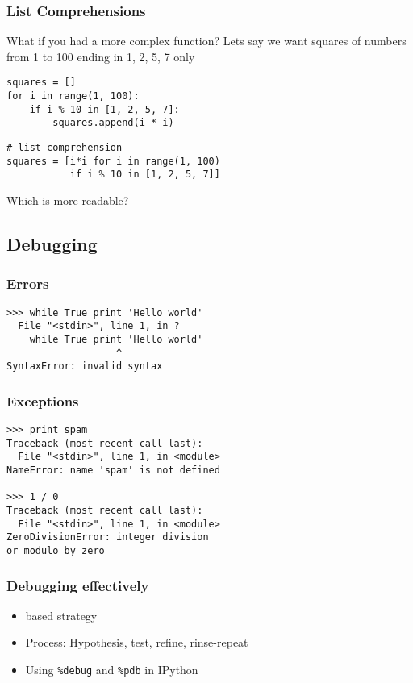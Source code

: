 \documentclass[14pt,compress]{beamer}
\newcounter{time}
\newcommand{\inctime}[1]{\addtocounter{time}{#1}{\tiny \thetime\ m}}
\newcommand{\typ}[1]{\texttt{#1}}
\newcommand{\kwrd}[1]{ \texttt{\textbf{\color{blue}{#1}}}  }
\begin{document}
\begin{frame}[fragile]
    \frametitle{List Comprehensions}
What if you had a more complex function?
Lets say we want squares of numbers from 1 to 100 ending in 1, 2, 5, 7 only
    \begin{lstlisting}
squares = []
for i in range(1, 100):
    if i % 10 in [1, 2, 5, 7]:
        squares.append(i * i)
    \end{lstlisting}
    \begin{lstlisting}
# list comprehension
squares = [i*i for i in range(1, 100)
           if i % 10 in [1, 2, 5, 7]]
     \end{lstlisting}
Which is more readable?
\inctime{15}
\end{frame}


\subsection{Debugging}
\begin{frame}[fragile]
 \frametitle{Errors}
 \begin{lstlisting}
>>> while True print 'Hello world'
  File "<stdin>", line 1, in ?
    while True print 'Hello world'
                   ^
SyntaxError: invalid syntax
\end{lstlisting}
\end{frame}

\begin{frame}[fragile]
 \frametitle{Exceptions}
 \begin{lstlisting}
>>> print spam
Traceback (most recent call last):
  File "<stdin>", line 1, in <module>
NameError: name 'spam' is not defined

>>> 1 / 0
Traceback (most recent call last):
  File "<stdin>", line 1, in <module>
ZeroDivisionError: integer division 
or modulo by zero
\end{lstlisting}
\end{frame}

\begin{frame}[fragile]
    \frametitle{Debugging effectively}

    \begin{itemize}
        \item  \kwrd{print} based strategy
        \item Process: Hypothesis, test, refine, rinse-repeat
        \item Using \typ{\%debug} and \typ{\%pdb} in IPython
    \end{itemize}
\end{frame}
\end{document}
